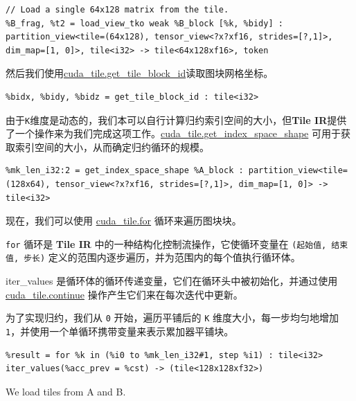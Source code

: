 \documentclass{article}
\begin{document}
\begin{lstlisting}
// Load a single 64x128 matrix from the tile.
%B_frag, %t2 = load_view_tko weak %B_block [%k, %bidy] : partition_view<tile=(64x128), tensor_view<?x?xf16, strides=[?,1]>, dim_map=[1, 0]>, tile<i32> -> tile<64x128xf16>, token
\end{lstlisting}

然后我们使用\href{https://docs.nvidia.com/cuda/tile-ir/latest/sections/operations.html#op-cuda-tile-get-tile-block-id}{cuda\_tile.get\_tile\_block\_id}读取图块网格坐标。


\begin{lstlisting}
%bidx, %bidy, %bidz = get_tile_block_id : tile<i32>
\end{lstlisting}

由于\texttt{K}维度是动态的，我们本可以自行计算归约索引空间的大小，但\textbf{Tile IR}提供了一个操作来为我们完成这项工作。\href{https://docs.nvidia.com/cuda/tile-ir/latest/sections/operations.html#op-cuda-tile-get-index-space-shape}{cuda\_tile.get\_index\_space\_shape} 可用于获取索引空间的大小，从而确定归约循环的规模。


\begin{lstlisting}
%mk_len_i32:2 = get_index_space_shape %A_block : partition_view<tile=(128x64), tensor_view<?x?xf16, strides=[?,1]>, dim_map=[1, 0]> -> tile<i32>
\end{lstlisting}

现在，我们可以使用 \href{https://docs.nvidia.com/cuda/tile-ir/latest/sections/operations.html#op-cuda-tile-for}{cuda\_tile.for} 循环来遍历图块块。


\texttt{for} 循环是 \textbf{Tile IR} 中的一种结构化控制流操作，它使循环变量在 \texttt{(起始值, 结束值, 步长)} 定义的范围内逐步遍历，并为范围内的每个值执行循环体。

iter\_values 是循环体的循环传递变量，它们在循环头中被初始化，并通过使用 \href{https://docs.nvidia.com/cuda/tile-ir/latest/sections/operations.html#op-cuda-tile-continue}{cuda\_tile.continue} 操作产生它们来在每次迭代中更新。


为了实现归约，我们从 \texttt{0} 开始，遍历平铺后的 \texttt{K} 维度大小，每一步均匀地增加 \texttt{1}，并使用一个单循环携带变量来表示累加器平铺块。


\begin{lstlisting}
%result = for %k in (%i0 to %mk_len_i32#1, step %i1) : tile<i32>
iter_values(%acc_prev = %cst) -> (tile<128x128xf32>)
\end{lstlisting}

We load tiles from A and B.
\end{document}
